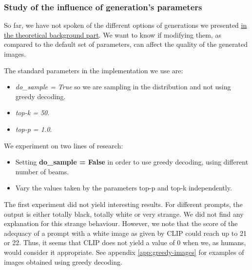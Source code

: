 \documentclass{article}
\begin{document}
\begin{multicols}{2}
\subsubsection{Study of the influence of generation's parameters}

So far, we have not spoken of the different options of generations we presented \hyperlink{options-generation}{in the theoretical background part}. We want to know if modifying them, as compared to the default set of parameters, can affect the quality of the generated images.

The standard parameters in the implementation we use are:
\begin{itemize}
    \item \textit{do\_sample = True} so we are sampling in the distribution and not using greedy decoding.
    \item \textit{top-k = 50}.
    \item \textit{top-p = 1.0}.
\end{itemize}

We experiment on two lines of research:
\begin{itemize}
    \item Setting \textbf{do\_sample = False} in order to use greedy decoding, using different number of beams.
    \item Vary the values taken by the parameters top-p and top-k independently.
\end{itemize}

The first experiment did not yield interesting results. For different prompts, the output is either totally black, totally white or very strange. We did not find any explanation for this strange behaviour. However, we note that the score of the adequacy of a prompt with a white image as given by CLIP could reach up to 21 or 22. Thus, it seems that CLIP does not yield a value of 0 when we, as humans, would consider it appropriate. See appendix \ref{app:greedy-images} for examples of images obtained using greedy decoding. 


\end{multicols}
\end{document}
